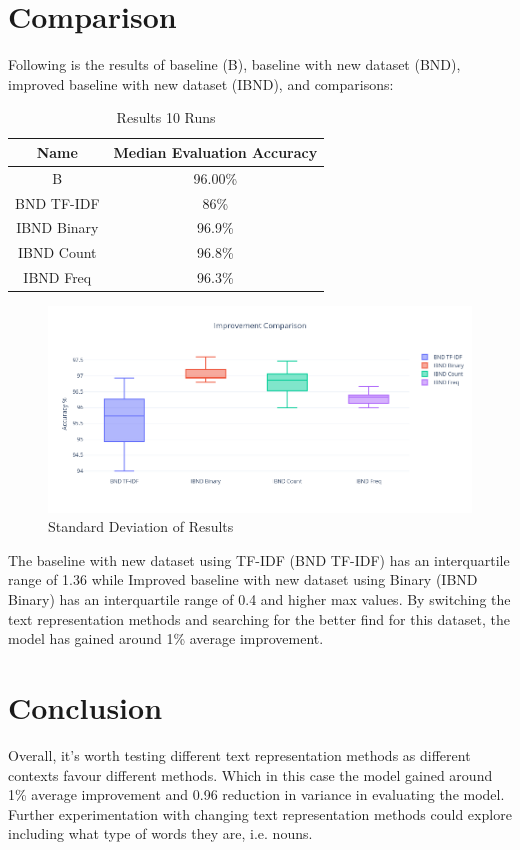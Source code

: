 \documentclass{article}
\begin{document}
\section{Comparison}
Following is the results of baseline (B), baseline with new dataset (BND), improved baseline with new dataset (IBND), and comparisons:


\begin{table}[H]
\centering
\caption{Results 10 Runs}
\begin{tabular}{c c}
\hline
Name& Median Evaluation Accuracy\\
\hline
B&	96.00\%\\
BND TF-IDF&	86\%\\
IBND Binary&96.9\%\\
IBND Count&	96.8\%\\
IBND Freq&	96.3\%\\

\end{tabular}
\end{table}

\begin{figure}[H]
  \centering
   \hspace*{-3.2cm}
      \includegraphics[width=1.5\textwidth]{imp}
  \caption{Standard Deviation of Results}
\end{figure}

\noindent
The baseline with new dataset using TF-IDF (BND TF-IDF) has an interquartile range of 1.36 while Improved baseline with new dataset using Binary (IBND Binary) has an interquartile range of 0.4 and higher max values. By switching the text representation methods and searching for the better find for this dataset, the model has gained around 1\% average improvement.

\section{Conclusion}
Overall, it’s worth testing different text representation methods as different contexts favour different methods. Which in this case the model gained around 1\% average improvement and 0.96 reduction in variance in evaluating the model. Further experimentation with changing text representation methods could explore including what type of words they are, i.e. nouns. 
\end{document}
